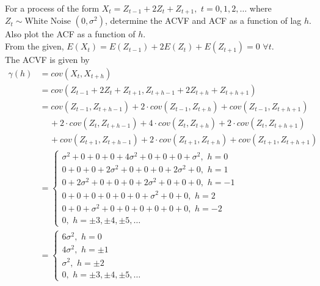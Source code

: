 \documentclass[11pt, a4paper]{article}
\numberwithin{equation}{section}
\theoremstyle{definition}
\begin{document}
\bcquestion \hspace{0.1cm} For a process of the form $X_t = Z_{t-1} + 2 Z_t + Z_{t+1}, \,\, t = 0, 1, 2, \ldots$ where $Z_t \sim \text{White Noise } (0, \sigma^2)$, determine the ACVF and ACF as a function of lag $h$. Also plot the ACF as a function of $h$. \\

\bccrayon \hspace{0.1cm} From the given, $E(X_t) = E(Z_{t-1}) + 2 E(Z_t) + E(Z_{t+1}) = 0 \,\, \forall t$. \\

The ACVF is given by
\begin{align*}
\gamma(h) &= cov(X_t, X_{t+h}) \\[0.25em]
&= cov(Z_{t-1} + 2 Z_t + Z_{t+1}, Z_{t+h-1} + 2 Z_{t+h} + Z_{t+h+1}) \\[0.25em]
&= cov(Z_{t-1}, Z_{t+h-1}) + 2 \cdot cov(Z_{t-1}, Z_{t+h}) + cov(Z_{t-1}, Z_{t+h+1}) \\
& \,\,\,\,\,\,\, + 2 \cdot cov(Z_t, Z_{t+h-1}) + 4 \cdot cov(Z_{t}, Z_{t+h}) + 2 \cdot cov(Z_{t}, Z_{t+h+1}) \\
& \,\,\,\,\,\,\, + cov(Z_{t+1}, Z_{t+h-1}) + 2 \cdot cov(Z_{t+1}, Z_{t+h}) + cov(Z_{t+1}, Z_{t+h+1}) \\[1em]
&= \begin{cases}
\sigma^2 + 0 + 0 + 0 + 4 \sigma^2 + 0 + 0 + 0 + \sigma^2, \,\, h = 0 \\
0 + 0 + 0 + 2 \sigma^2 + 0 + 0 + 0 + 2 \sigma^2 + 0, \,\, h = 1 \\
0 + 2 \sigma^2 + 0 + 0 + 0 + 2 \sigma^2 + 0 + 0 + 0, \,\, h = -1 \\
0 + 0 + 0 + 0 + 0 + 0 + \sigma^2 + 0 + 0, \,\, h = 2 \\
0 + 0 + \sigma^2 + 0 + 0 + 0 + 0 + 0 + 0, \,\, h = -2 \\
0, \,\, h = \pm 3, \pm 4, \pm 5, \ldots
\end{cases} \\[1em]
&= \begin{cases}
6\sigma^2, \,\, h = 0 \\
4\sigma^2, \,\, h = \pm 1 \\
\sigma^2, \,\, h = \pm 2 \\
0, \,\, h = \pm 3, \pm 4, \pm 5, \ldots
\end{cases}
\end{align*}
\\
\end{document}
